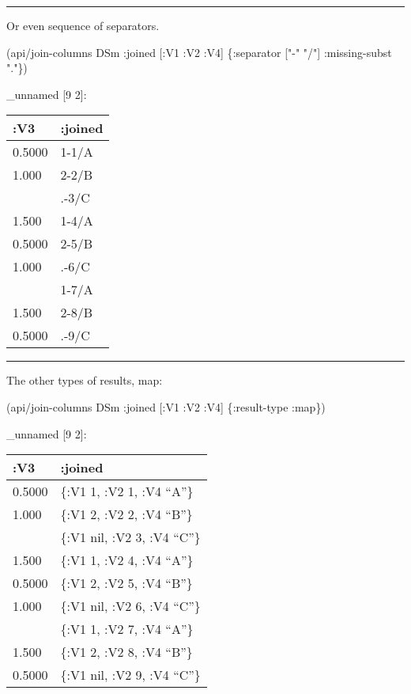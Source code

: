 \documentclass[]{article}
\newenvironment{Shaded}{\begin{snugshade}}{\end{snugshade}}
\newcommand{\StringTok}[1]{\textcolor[rgb]{0.31,0.60,0.02}{#1}}
\newcommand{\AttributeTok}[1]{\textcolor[rgb]{0.77,0.63,0.00}{#1}}
\newcommand{\NormalTok}[1]{#1}
\begin{document}
\begin{center}\rule{0.5\linewidth}{0.5pt}\end{center}

Or even sequence of separators.

\begin{Shaded}
\begin{Highlighting}[]
\NormalTok{(api/join-columns DSm }\AttributeTok{:joined}\NormalTok{ [}\AttributeTok{:V1} \AttributeTok{:V2} \AttributeTok{:V4}\NormalTok{] \{}\AttributeTok{:separator}\NormalTok{ [}\StringTok{"-"} \StringTok{"/"}\NormalTok{]}
                                             \AttributeTok{:missing-subst} \StringTok{"."}\NormalTok{\})}
\end{Highlighting}
\end{Shaded}

\_unnamed {[}9 2{]}:

\begin{longtable}[]{@{}ll@{}}
\toprule
:V3 & :joined\tabularnewline
\midrule
\endhead
0.5000 & 1-1/A\tabularnewline
1.000 & 2-2/B\tabularnewline
& .-3/C\tabularnewline
1.500 & 1-4/A\tabularnewline
0.5000 & 2-5/B\tabularnewline
1.000 & .-6/C\tabularnewline
& 1-7/A\tabularnewline
1.500 & 2-8/B\tabularnewline
0.5000 & .-9/C\tabularnewline
\bottomrule
\end{longtable}

\begin{center}\rule{0.5\linewidth}{0.5pt}\end{center}

The other types of results, map:

\begin{Shaded}
\begin{Highlighting}[]
\NormalTok{(api/join-columns DSm }\AttributeTok{:joined}\NormalTok{ [}\AttributeTok{:V1} \AttributeTok{:V2} \AttributeTok{:V4}\NormalTok{] \{}\AttributeTok{:result-type} \AttributeTok{:map}\NormalTok{\})}
\end{Highlighting}
\end{Shaded}

\_unnamed {[}9 2{]}:

\begin{longtable}[]{@{}ll@{}}
\toprule
:V3 & :joined\tabularnewline
\midrule
\endhead
0.5000 & \{:V1 1, :V2 1, :V4 ``A''\}\tabularnewline
1.000 & \{:V1 2, :V2 2, :V4 ``B''\}\tabularnewline
& \{:V1 nil, :V2 3, :V4 ``C''\}\tabularnewline
1.500 & \{:V1 1, :V2 4, :V4 ``A''\}\tabularnewline
0.5000 & \{:V1 2, :V2 5, :V4 ``B''\}\tabularnewline
1.000 & \{:V1 nil, :V2 6, :V4 ``C''\}\tabularnewline
& \{:V1 1, :V2 7, :V4 ``A''\}\tabularnewline
1.500 & \{:V1 2, :V2 8, :V4 ``B''\}\tabularnewline
0.5000 & \{:V1 nil, :V2 9, :V4 ``C''\}\tabularnewline
\bottomrule
\end{longtable}
\end{document}
